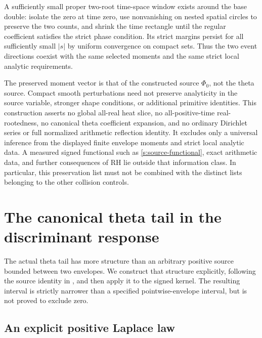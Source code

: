 A sufficiently small proper two-root time-space window exists around
the base double: isolate the zero at time zero, use nonvanishing on
nested spatial circles to preserve the two counts, and shrink the time
rectangle until the regular coefficient satisfies the strict phase
condition.  Its strict margins persist for all sufficiently small
$|s|$ by uniform convergence on compact sets.  Thus the two event
directions coexist with the same selected moments and the same strict
local analytic requirements.

\begin{remark}
The preserved moment vector is that of the constructed source
$\Phi_0$, not the theta source.  Compact smooth perturbations need not
preserve analyticity in the source variable, stronger shape conditions,
or additional primitive identities.  This construction asserts no
global all-real heat slice, no all-positive-time real-rootedness, no
canonical theta coefficient expansion, and no ordinary Dirichlet
series or full normalized arithmetic reflection identity.  It excludes
only a universal inference from the displayed finite envelope moments
and strict local analytic data.  A measured signed functional such as
\eqref{s:source-functional}, exact arithmetic data, and further
consequences of RH lie outside that information class.  In particular,
this preservation list must not be combined with the distinct lists
belonging to the other collision controls.
\end{remark}

\section{The canonical theta tail in the discriminant response}
\label{s:canonical-tail}

The actual theta tail has more structure than an arbitrary positive
source bounded between two envelopes.  We construct that structure
explicitly, following the source identity in \cite{tail04}, and then
apply it to the signed kernel.  The resulting interval is strictly
narrower than a specified pointwise-envelope interval, but is not
proved to exclude zero.

\subsection{An explicit positive Laplace law}

